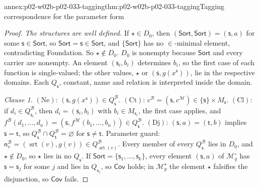 \begin{annexitem}{annex:p02-w02b-p02-033-tagging}{thm:p02-w02b-p02-033-tagging}{Tagging correspondence for the parameter form}
\begin{proof}
\emph{The structures are well defined.}  If \(\star\in D_0\), then
\((\mathsf{Sort},\mathsf{Sort})=(\mathsf s,a)\) for some
\(\mathsf s\in\mathsf{Sort}\), so \(\mathsf{Sort}=\mathsf s\in\mathsf{Sort}\),
and \(\{\mathsf{Sort}\}\) has no \(\in\)-minimal element, contradicting
Foundation.  So \(\star\notin D_0\).  \(D_0\) is nonempty because
\(\mathsf{Sort}\) and every carrier are nonempty.  An element
\((\mathsf s_i,b_i)\) determines \(b_i\), so the first case of each function
is single-valued; the other values, \(\star\) or
\((\mathsf s,g(x^{\mathsf s}))\), lie in the respective domains.  Each
\(Q_{\mathsf s}\), constant, name and relation is interpreted inside the
domain.

\emph{Clause 1.}  \((\mathrm{Ne})\): \((\mathsf s,g(x^{\mathsf s}))\in
Q_{\mathsf s}^{\mathcal B}\).  \((\mathrm{Ct})\): \(c^{\mathcal B}=
(\mathsf s,c^{\mathcal M})\in\{\mathsf s\}\times M_{\mathsf s}\).
\((\mathrm{Cl})\): if \(d_i\in Q_{\mathsf s_i}^{\mathcal B}\), then
\(d_i=(\mathsf s_i,b_i)\) with \(b_i\in M_{\mathsf s_i}\), the first case
applies, and \(f^{\mathcal B}(d_1,\ldots,d_n)=
(\mathsf s,f^{\mathcal M}(b_1,\ldots,b_n))\in Q_{\mathsf s}^{\mathcal B}\).
\((\mathrm{Dj})\): \((\mathsf s,a)=(\mathsf t,b)\) implies
\(\mathsf s=\mathsf t\), so \(Q_{\mathsf s}^{\mathcal B}\cap
Q_{\mathsf t}^{\mathcal B}=\varnothing\) for \(\mathsf s\ne\mathsf t\).
Parameter guard: \(\mathsf n_v^{\mathcal B}=(\operatorname{srt}(v),g(v))\in
Q_{\operatorname{srt}(v)}^{\mathcal B}\).  Every member of every
\(Q_{\mathsf s}^{\mathcal B}\) lies in \(D_0\), and \(\star\notin D_0\), so
\(\star\) lies in no \(Q_{\mathsf s}\).  If
\(\mathsf{Sort}=\{\mathsf s_1,\ldots,\mathsf s_k\}\), every element
\((\mathsf s,a)\) of \(\mathcal M^{\circ}_{g}\) has
\(\mathsf s=\mathsf s_j\) for some \(j\) and lies in
\(Q_{\mathsf s_j}\), so \(\mathsf{Cov}\) holds; in \(\mathcal M^{\star}_{g}\)
the element \(\star\) falsifies the disjunction, so \(\mathsf{Cov}\) fails.


\end{proof}
\end{annexitem}
